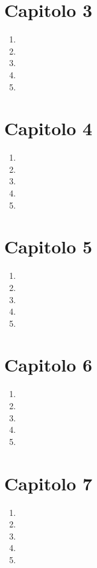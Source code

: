 \documentclass[ paper=a4
              , pagesize
              , fontsize=12pt
              , twoside=true
              , BCOR=5mm
              , DIV=calc
              , bibliography=totoc
              , final
              , version=last
              ]{scrbook}
\begin{document}
\section*{Capitolo 3}
\begin{enumerate}
    \item
    \item
    \item
    \item
    \item
\end{enumerate}
\section*{Capitolo 4}
\begin{enumerate}
    \item
    \item
    \item
    \item
    \item
\end{enumerate}
\section*{Capitolo 5}
\begin{enumerate}
    \item
    \item
    \item
    \item
    \item
\end{enumerate}
\section*{Capitolo 6}
\begin{enumerate}
    \item
    \item
    \item
    \item
    \item
\end{enumerate}
\section*{Capitolo 7}
\begin{enumerate}
    \item
    \item
    \item
    \item
    \item
\end{enumerate}
\end{document}
